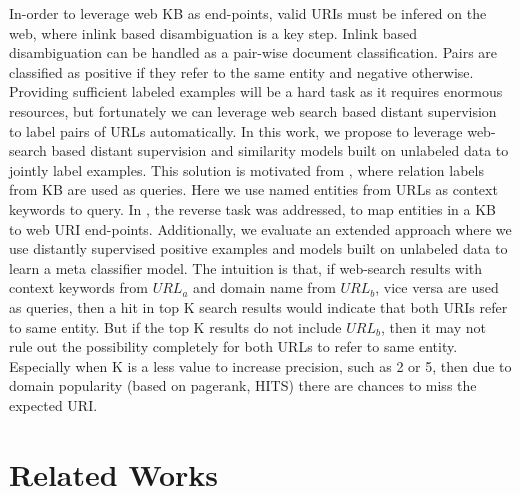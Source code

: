 \documentclass{sig-alternate-05-2015}
\begin{document}
In-order to leverage web KB as end-points, valid URIs must be infered on the web, where inlink based disambiguation is a key step. Inlink based disambiguation can be handled as a pair-wise document classification. Pairs are classified as positive if they refer to the same entity and negative otherwise. Providing sufficient labeled examples will be a hard task as it requires enormous resources, but fortunately we can leverage web search based distant supervision to label pairs of URLs automatically. In this work, we propose to leverage web-search based distant supervision and similarity models built on unlabeled data to jointly label examples. This solution is motivated from \cite{hachenbergfinding}, where relation labels from KB are used as queries. Here we use named entities from URLs as context keywords to query.  In \cite{hachenbergfinding}, the reverse task was addressed, to map entities in a KB to web URI end-points. Additionally, we evaluate an extended approach where we use distantly supervised positive examples and models built on unlabeled data to learn a meta classifier model. The intuition is that, if web-search results with context keywords from $URL_{a}$ and domain name from $URL_{b}$, vice versa are used as queries, then a hit in top K search results would indicate that both URIs refer to same entity. But if the top K results do not include $URL_{b}$, then it may not rule out the possibility completely for both URLs to refer to same entity. Especially when K is a less value to increase precision, such as 2 or 5, then due to domain popularity (based on pagerank, HITS) there are chances to miss the expected URI. 

\section{Related Works}
\end{document}
